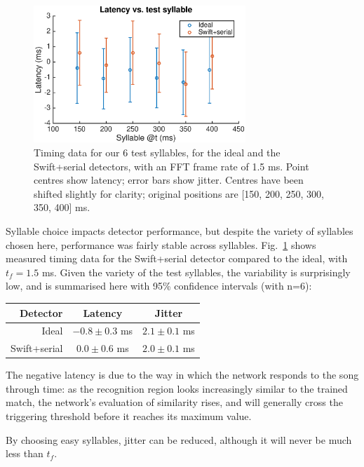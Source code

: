 \documentclass[10pt,letterpaper]{article}
\newcommand\fig[1]{Fig.~\ref{#1}}
\begin{document}
\begin{figure}
  \begin{center}
    \includegraphics[width=8cm]{TimingVsSyllable}
  \end{center}
  \caption{Timing data for our 6 test syllables, for the ideal and the Swift+serial detectors, with an FFT frame rate of 1.5 ms.  Point centres show latency; error bars show jitter.  Centres have been shifted slightly for clarity; original positions are [150, 200, 250, 300, 350, 400] ms.}
  \label{fig:TimingVsSyllable}
\end{figure}

Syllable choice impacts detector performance, but despite the variety of syllables chosen here, performance was fairly stable across syllables.  \fig{fig:TimingVsSyllable} shows measured timing data for the Swift+serial detector compared to the ideal, with $t_f=1.5$ ms.  Given the variety of the test syllables, the variability is surprisingly low, and is summarised here with 95\% confidence intervals (with n=6):
\vspace{8pt}\par\noindent
\begin{tabular}{r|cc}
  Detector & Latency & Jitter \\ 
  \hline   Ideal & $-0.8\pm 0.3$ ms & $2.1\pm 0.1$ ms \\
  Swift+serial & $0.0\pm 0.6$ ms & $2.0\pm 0.1$ ms
\end{tabular}
\vspace{8pt}\par\noindent
The negative latency is due to the way in which the network responds to the song through time: as the recognition region looks increasingly similar to the trained match, the network's evaluation of similarity rises, and will generally cross the triggering threshold before it reaches its maximum value.

By choosing easy syllables, jitter can be reduced, although it will never be much less than $t_f$.
\end{document}
